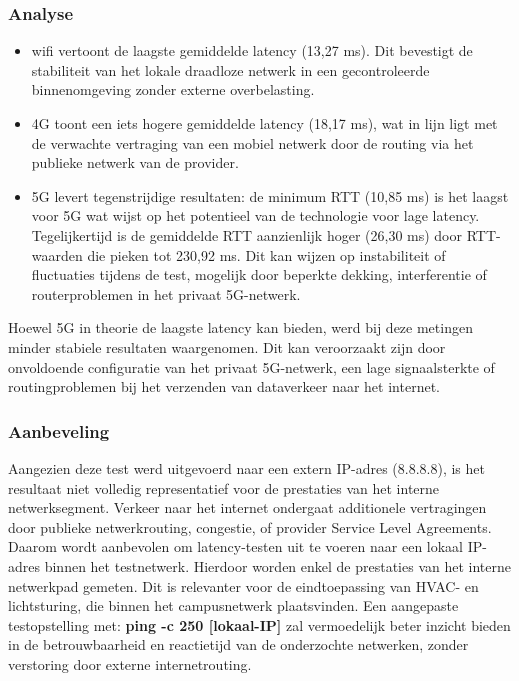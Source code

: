 \subsubsection{Analyse}
\begin{itemize}
    \item wifi vertoont de laagste gemiddelde latency (13,27 ms). Dit bevestigt de stabiliteit van het lokale draadloze netwerk in een gecontroleerde binnenomgeving zonder externe overbelasting.
    \item 4G toont een iets hogere gemiddelde latency (18,17 ms), wat in lijn ligt met de verwachte vertraging van een mobiel netwerk door de routing via het publieke netwerk van de provider.
    \item 5G levert tegenstrijdige resultaten: de minimum RTT (10,85 ms) is het laagst voor 5G wat wijst op het potentieel van de technologie voor lage latency. Tegelijkertijd is de gemiddelde RTT aanzienlijk hoger (26,30 ms) door RTT-waarden die pieken tot 230,92 ms. Dit kan wijzen op instabiliteit of fluctuaties tijdens de test, mogelijk door beperkte dekking, interferentie of routerproblemen in het privaat 5G-netwerk.
\end{itemize}
Hoewel 5G in theorie de laagste latency kan bieden, werd bij deze metingen minder stabiele resultaten waargenomen. Dit kan veroorzaakt zijn door onvoldoende configuratie van het privaat 5G-netwerk, een lage signaalsterkte of routingproblemen bij het verzenden van dataverkeer naar het internet.

\subsubsection{Aanbeveling}
Aangezien deze test werd uitgevoerd naar een extern IP-adres (8.8.8.8), is het resultaat niet volledig representatief voor de prestaties van het interne netwerksegment.
Verkeer naar het internet ondergaat additionele vertragingen door publieke netwerkrouting, congestie, of provider Service Level Agreements. Daarom wordt aanbevolen om latency-testen uit te voeren naar een lokaal IP-adres binnen het testnetwerk. Hierdoor worden enkel de prestaties van het interne netwerkpad gemeten. Dit is relevanter voor de eindtoepassing van HVAC- en lichtsturing, die binnen het campusnetwerk plaatsvinden. Een aangepaste testopstelling met: \textbf{ping -c 250 [lokaal-IP]} zal vermoedelijk beter inzicht bieden in de betrouwbaarheid en reactietijd van de onderzochte netwerken, zonder verstoring door externe internetrouting.


